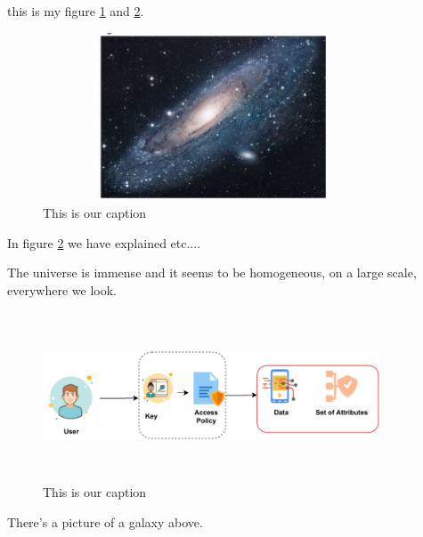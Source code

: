 \documentclass[12pt]{article}
\begin{document}
this is my figure \ref{fig:FebAA_Working} and \ref{FebAA_Working}. 

\begin{figure}
\caption{This is our caption }
    \includegraphics[width=10cm, height=5cm]{images/1}
    
\label{fig:FebAA_Working}       %
\end{figure}









In figure \ref{FebAA_Working} we have explained etc.... 



The universe is immense and it seems to be homogeneous, 
on a large scale, everywhere we look.

\begin{figure}
  \centering
    \includegraphics[width=10cm, height=5cm]{images/2.333.pdf}
    \caption{This is our caption }
\label{FebAA_Working}       %
\end{figure}





  
 
There's a picture of a galaxy above.
\end{document}
